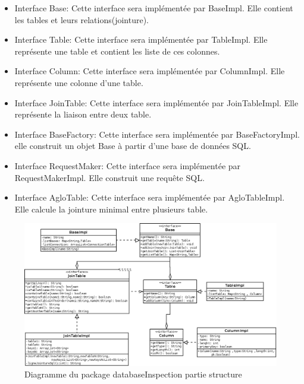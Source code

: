 \documentclass[12pt]{report}
\begin{document}
\begin{itemize}
\item Interface Base: Cette interface sera implémentée par BaseImpl. Elle contient les tables et leurs relations(jointure).
\item Interface Table: Cette interface sera implémentée par TableImpl. Elle représente une table et contient les liste de ces colonnes.
\item Interface Column: Cette interface sera implémentée par ColumnImpl. Elle représente une colonne d'une table.
\item Interface JoinTable: Cette interface sera implémentée par JoinTableImpl. Elle représente la liaison entre deux table.
\item Interface BaseFactory: Cette interface sera implémentée par BaseFactoryImpl. elle construit un objet Base à partir d'une base de données SQL.
\item Interface RequestMaker: Cette interface sera implémentée par RequestMakerImpl. Elle construit une requête SQL.
\item Interface AgloTable: Cette interface sera implémentée par AgloTableImpl. Elle calcule la jointure minimal entre plusieurs table.
\end{itemize}

\begin{figure}[h!]
\begin{center}
\includegraphics[scale=0.4]{bduml/structDataBase.png}
\caption{Diagramme du package databaseInspection partie structure}
\end{center}
\end{figure}
\end{document}
